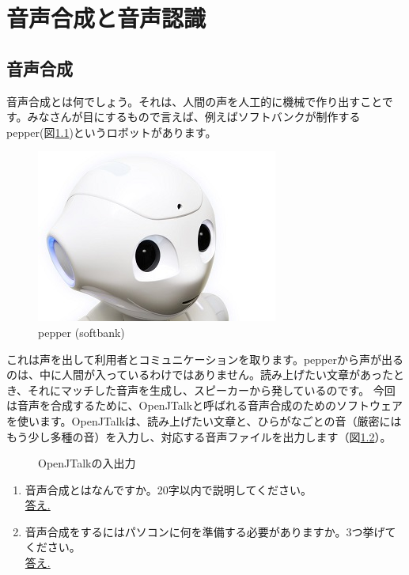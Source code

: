 \chapter{音声合成と音声認識}
\section{音声合成}
音声合成とは何でしょう。それは、人間の声を人工的に機械で作り出すことです。みなさんが目にするもので言えば、例えばソフトバンクが制作するpepper(図\ref{pepper})というロボットがあります。

\begin{figure}[H]
\begin{center}
    \includegraphics[width=0.5\linewidth]{images/chap06/text06-img001.jpg}
    \caption{pepper (softbank)}
    \label{pepper}
\end{center}
\end{figure}

これは声を出して利用者とコミュニケーションを取ります。pepperから声が出るのは、中に人間が入っているわけではありません。読み上げたい文章があったとき、それにマッチした音声を生成し、スピーカーから発しているのです。
今回は音声を合成するために、OpenJTalkと呼ばれる音声合成のためのソフトウェアを使います。OpenJTalkは、読み上げたい文章と、ひらがなごとの音（厳密にはもう少し多種の音）を入力し、対応する音声ファイルを出力します（図\ref{OpenJTalkの入出力}）。

\begin{figure}[H]
\begin{center}
    
    \caption{OpenJTalkの入出力}
    \label{OpenJTalkの入出力}
\end{center}
\end{figure}

\begin{tcolorbox}[title=\useOmetoi]
\begin{enumerate}
\item 音声合成とはなんですか。20字以内で説明してください。\\
\underline{答え.\hspace{0.8\linewidth}}
\item 音声合成をするにはパソコンに何を準備する必要がありますか。3つ挙げてください。\\
\underline{答え.\hspace{0.8\linewidth}}
\end{enumerate}
\end{tcolorbox}